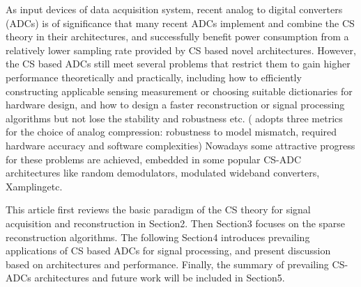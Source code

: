 As input devices of data acquisition system, recent analog to digital converters (ADCs) is of significance that many recent ADCs implement and combine the CS theory in their architectures, and successfully benefit power consumption from a relatively lower sampling rate provided by CS based novel architectures. However, the CS based ADCs still meet several problems that restrict them to gain higher performance theoretically and practically, including how to efficiently constructing applicable sensing measurement or choosing suitable dictionaries for hardware design\cite{davenport2012signal,davenport2012compressive}, and how to design a faster reconstruction or signal processing algorithms but not lose the stability and robustness\cite{mishali2011xamplingsignal,davenport2010signal} etc. (\cite{mishali2011xamplingsignal} adopts three metrics for the choice of analog compression: robustness to model mismatch, required hardware accuracy and software complexities) Nowadays some attractive progress for these problems are achieved, embedded in some popular CS-ADC architectures like random demodulators\cite{kirolos2006analog}, modulated wideband converters\cite{mishali2010theory}, Xampling\cite{mishali2012xampling}etc.

This article first reviews the basic paradigm of the CS theory for signal acquisition and reconstruction in Section2. Then Section3 focuses on the sparse reconstruction algorithms. The following Section4 introduces prevailing applications of CS based ADCs for signal processing, and present discussion based on architectures and performance. Finally, the summary of prevailing CS-ADCs architectures and future work will be included in Section5.
